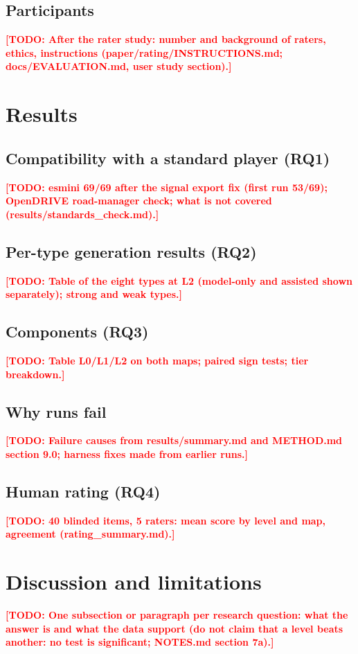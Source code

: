 \documentclass[preprint,12pt]{elsarticle}
\newcommand{\todo}[1]{\textcolor{red}{\textbf{[TODO: #1]}}}
\begin{document}
\subsection{Participants}
\todo{After the rater study: number and background of raters, ethics, instructions (paper/rating/INSTRUCTIONS.md; docs/EVALUATION.md, user study section).}

\section{Results}
\subsection{Compatibility with a standard player (RQ1)}
\todo{esmini 69/69 after the signal export fix (first run 53/69); OpenDRIVE road-manager check; what is not covered (results/standards\_check.md).}
\subsection{Per-type generation results (RQ2)}
\todo{Table of the eight types at L2 (model-only and assisted shown separately); strong and weak types.}
\subsection{Components (RQ3)}
\todo{Table L0/L1/L2 on both maps; paired sign tests; tier breakdown.}
\subsection{Why runs fail}
\todo{Failure causes from results/summary.md and METHOD.md section 9.0; harness fixes made from earlier runs.}
\subsection{Human rating (RQ4)}
\todo{40 blinded items, 5 raters: mean score by level and map, agreement (rating\_summary.md).}

\section{Discussion and limitations}
\todo{One subsection or paragraph per research question: what the answer is and what the data support (do not claim that a level beats another: no test is significant; NOTES.md section 7a).}
\end{document}
